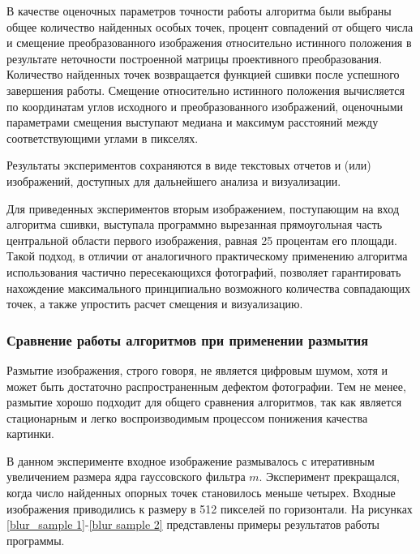 {{   		В качестве оценочных параметров точности работы алгоритма были выбраны общее количество найденных особых точек, процент совпадений от общего числа и смещение преобразованного изображения относительно истинного положения в результате неточности построенной матрицы проективного преобразования.
   		Количество найденных точек возвращается функцией сшивки после успешного завершения работы. Смещение относительно истинного положения вычисляется по координатам углов исходного и преобразованного изображений, оценочными параметрами смещения выступают медиана и максимум расстояний между соответствующими углами в пикселях. 
   		
   		Результаты экспериментов сохраняются в виде текстовых отчетов и (или) изображений, доступных для дальнейшего анализа и визуализации.
   		
   		Для приведенных экспериментов вторым изображением, поступающим на вход алгоритма сшивки, выступала программно вырезанная прямоугольная часть центральной области первого изображения, равная 25 процентам его площади. Такой подход, в отличии от аналогичного практическому применению алгоритма использования частично пересекающихся фотографий, позволяет гарантировать нахождение максимального принципиально возможного количества совпадающих точек, а также упростить расчет смещения и визуализацию.
   		\newpage
   			\subsubsection{ Сравнение работы алгоритмов при применении размытия } Размытие изображения, строго говоря, не является цифровым шумом, хотя и может быть достаточно распространенным дефектом фотографии. Тем не менее, размытие хорошо подходит для общего сравнения алгоритмов, так как является стационарным и легко воспроизводимым процессом понижения качества картинки. 
   			
   			В данном эксперименте входное изображение размывалось с итеративным увеличением размера ядра гауссовского фильтра $m$. Эксперимент прекращался, когда число найденных опорных точек становилось меньше четырех. Входные изображения приводились к размеру в 512 пикселей по горизонтали. На рисунках \ref{blur_sample 1}-\ref{blur sample 2} представлены примеры результатов работы программы.
   			
}}
